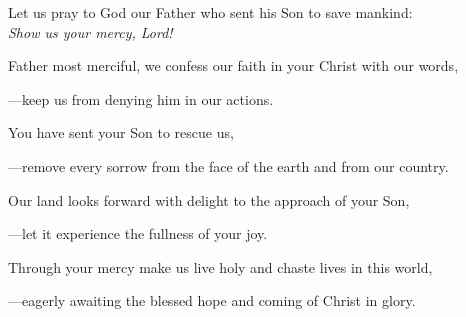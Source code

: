 \intercessions\indent

\begin{hangpar}

Let us pray to God our Father who sent his Son to save mankind:\\
\emph{Show us your mercy, Lord!}

\medskip Father most merciful, we confess our faith in your Christ with our words,

{\color{red}---\thinspace}keep us from denying him in our actions.

\medskip You have sent your Son to rescue us,

{\color{red}---\thinspace}remove every sorrow from the face of the earth and from our country.

\medskip Our land looks forward with delight to the approach of your Son,

{\color{red}---\thinspace}let it experience the fullness of your joy.

\medskip Through your mercy make us live holy and chaste lives in this world,

{\color{red}---\thinspace}eagerly awaiting the blessed hope and coming of Christ in glory.

\end{hangpar}